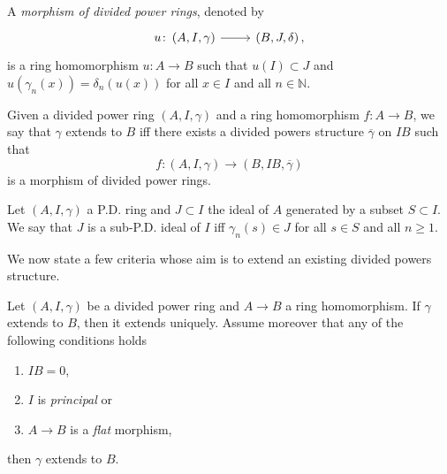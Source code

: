 \begin{defn}
	A {\em morphism of divided power rings}, denoted by
	\begin{equation*}
	\begin{tikzcd}[row sep = 0ex
		,/tikz/column 1/.append style={anchor=base east}
		,/tikz/column 2/.append style={anchor=base west}]
		u\colon \left(A, I, \gamma\right) 
		\arrow[r, "", rightarrow] &
		\left(B, J, \delta\right)
	,\end{tikzcd}
	\end{equation*} 
	is a ring homomorphism $u\colon A \to B$ such that
	$u(I) \subset J$ and $u(\gamma_n(x)) = \delta_n(u(x))$
	for all $x \in I$ and all $n \in \mathbb{N}$.
\end{defn}


\begin{defn}[]\label{RingExtendingDivPowers}
	Given a divided power ring $\left(A, I, \gamma\right)$ and
	a ring homomorphism $f\colon A \to B$, we say that
	$\gamma$ extends to $B$ iff there exists a divided powers
	structure $\overline{\gamma}$ on $IB$ such that
	\begin{equation*}
		f\colon \left(A, I, \gamma\right) \to \left(B, IB, \overline{\gamma}\right)
	\end{equation*}
	is a morphism of divided power rings.
\end{defn}


\begin{defn}
	Let $\left(A, I, \gamma\right)$ a P.D. ring and $J \subset I$
	the ideal of $A$ generated by a subset $S \subset I$.
	We say that $J$ is a sub-P.D. ideal of $I$
	iff $\gamma_n(s) \in J$ for all $s \in S$
	and all $n \geq 1$.
\end{defn}


\noindent
We now state a few criteria whose aim is to extend an existing divided powers structure.
\begin{lem}
\label{lem:PDFlatExtension}
	Let $\left(A, I, \gamma\right)$ be a divided power ring
	and $A \to B$ a ring homomorphism.
	If $\gamma$ extends to $B$, then it extends uniquely.
	Assume moreover that any of the following conditions holds
\begin{enumerate}
	\item $IB = 0$,
	\item $I$ is {\em principal} or
	\item $A \to B$ is a {\em flat} morphism,
\end{enumerate}
	then $\gamma$ extends to $B$.
\end{lem} 


